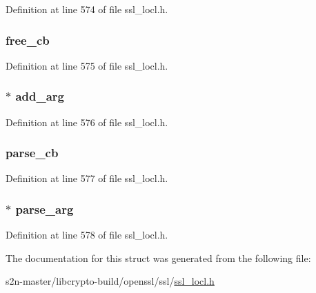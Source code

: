 Definition at line 574 of file ssl\+\_\+locl.\+h.

\subsubsection[{\texorpdfstring{free\+\_\+cb}{free_cb}}]{ free\+\_\+cb}\hypertarget{structcustom__ext__method_a3e3f1026964aa708fc4538067158a285}{}\label{structcustom__ext__method_a3e3f1026964aa708fc4538067158a285}


Definition at line 575 of file ssl\+\_\+locl.\+h.

\subsubsection[{\texorpdfstring{add\+\_\+arg}{add_arg}}]{$\ast$ add\+\_\+arg}\hypertarget{structcustom__ext__method_ae00b644bf03a698e777c2e8ad533a8a5}{}\label{structcustom__ext__method_ae00b644bf03a698e777c2e8ad533a8a5}


Definition at line 576 of file ssl\+\_\+locl.\+h.

\subsubsection[{\texorpdfstring{parse\+\_\+cb}{parse_cb}}]{ parse\+\_\+cb}\hypertarget{structcustom__ext__method_aa3ec38c896a89e8222455fbd45e0f041}{}\label{structcustom__ext__method_aa3ec38c896a89e8222455fbd45e0f041}


Definition at line 577 of file ssl\+\_\+locl.\+h.

\subsubsection[{\texorpdfstring{parse\+\_\+arg}{parse_arg}}]{$\ast$ parse\+\_\+arg}\hypertarget{structcustom__ext__method_a4e72d86fa8dc7e8ea2955cbc2a52d8f4}{}\label{structcustom__ext__method_a4e72d86fa8dc7e8ea2955cbc2a52d8f4}


Definition at line 578 of file ssl\+\_\+locl.\+h.



The documentation for this struct was generated from the following file\+:\begin{DoxyCompactItemize}
\item 
s2n-\/master/libcrypto-\/build/openssl/ssl/\hyperlink{ssl__locl_8h}{ssl\+\_\+locl.\+h}\end{DoxyCompactItemize}
